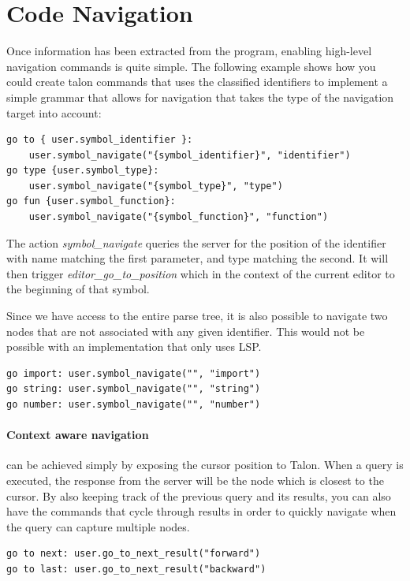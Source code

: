 \documentclass[../thesis.tex]{subfiles}
\begin{document}
\section{Code Navigation}%
\label{sec:code_navigation}
Once information has been extracted from the program, enabling high-level navigation commands is quite simple.
The following example shows how you could create talon commands that uses the classified identifiers
to implement a simple grammar that allows for navigation that takes the type of the navigation target
into account:
\begin{verbatim}
go to { user.symbol_identifier }:
    user.symbol_navigate("{symbol_identifier}", "identifier")
go type {user.symbol_type}:
    user.symbol_navigate("{symbol_type}", "type")
go fun {user.symbol_function}:
    user.symbol_navigate("{symbol_function}", "function")
\end{verbatim}
The action \textit{symbol\_navigate} queries the server
for the position of the identifier with name matching the first parameter, and type matching the second.
It will then trigger \textit{editor\_go\_to\_position} which in the context of the current editor
to the beginning of that symbol.

Since we have access to the entire parse tree, it is also possible to navigate two nodes that
are not associated with any given identifier.
This would not be possible with an implementation that only uses LSP.
\begin{verbatim}
go import: user.symbol_navigate("", "import")
go string: user.symbol_navigate("", "string")
go number: user.symbol_navigate("", "number")
\end{verbatim}

\paragraph{Context aware navigation}
can be achieved simply by exposing the cursor position to Talon.
When a query is executed, the response from the server will be the node
which is closest to the cursor. By also keeping track of
the previous query and its results, you can also have
the commands that cycle through results in order to quickly navigate
when the query can capture multiple nodes.
\begin{verbatim}
go to next: user.go_to_next_result("forward")
go to last: user.go_to_next_result("backward")
\end{verbatim}
\end{document}
